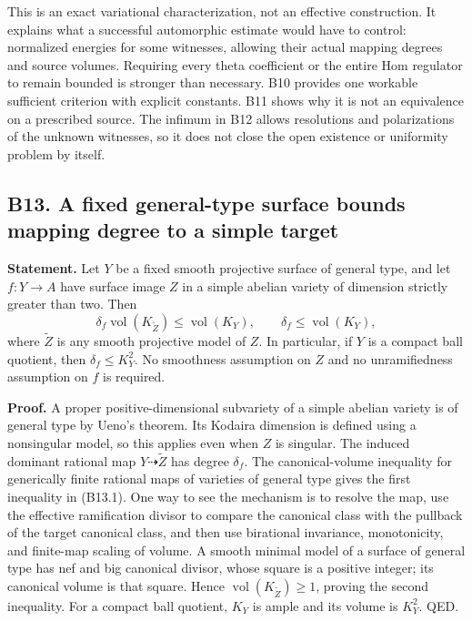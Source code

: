 This is an exact variational characterization, not an effective construction. It explains what a successful automorphic estimate would have to control: normalized energies for some witnesses, allowing their actual mapping degrees and source volumes. Requiring every theta coefficient or the entire Hom regulator to remain bounded is stronger than necessary. B10 provides one workable sufficient criterion with explicit constants. B11 shows why it is not an equivalence on a prescribed source. The infimum in B12 allows resolutions and polarizations of the unknown witnesses, so it does not close the open existence or uniformity problem by itself.

\subsection{B13. A fixed general-type surface bounds mapping degree to a simple target}\label{b13.-a-fixed-general-type-surface-bounds-mapping-degree-to-a-simple-target}

\textbf{Statement.} Let \(Y\) be a fixed smooth projective surface of general type, and let \(f:Y\to A\) have surface image \(Z\) in a simple abelian variety of dimension strictly greater than two. Then \[
 \delta_f\operatorname{vol}(K_{\widetilde Z})
 \le \operatorname{vol}(K_Y),\qquad
 \delta_f\le \operatorname{vol}(K_Y),
\tag{B13.1}
\] where \(\widetilde Z\) is any smooth projective model of \(Z\). In particular, if \(Y\) is a compact ball quotient, then \(\delta_f\le K_Y^2\). No smoothness assumption on \(Z\) and no unramifiedness assumption on \(f\) is required.

\textbf{Proof.} A proper positive-dimensional subvariety of a simple abelian variety is of general type by Ueno's theorem. Its Kodaira dimension is defined using a nonsingular model, so this applies even when \(Z\) is singular. The induced dominant rational map \(Y\dashrightarrow\widetilde Z\) has degree \(\delta_f\). The canonical-volume inequality for generically finite rational maps of varieties of general type gives the first inequality in (B13.1). One way to see the mechanism is to resolve the map, use the effective ramification divisor to compare the canonical class with the pullback of the target canonical class, and then use birational invariance, monotonicity, and finite-map scaling of volume. A smooth minimal model of a surface of general type has nef and big canonical divisor, whose square is a positive integer; its canonical volume is that square. Hence \(\operatorname{vol}(K_{\widetilde Z})\ge1\), proving the second inequality. For a compact ball quotient, \(K_Y\) is ample and its volume is \(K_Y^2\). QED.

